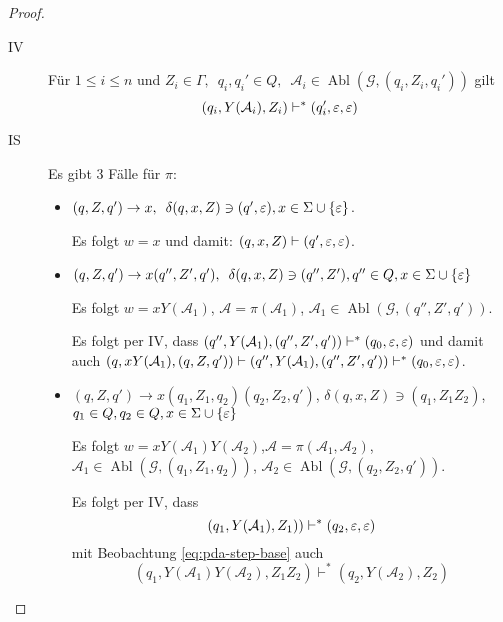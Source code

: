 \begin{proof}
\begin{itemize}
\begin{itemize}
      \begin{description}
      \item[IV] Für $1 \le i \le n$ und $Z_i \in \Gamma,\enspace q_i,q_i' \in Q,\enspace \mathcal{A}_i \in \operatorname{Abl}(\mathcal{G}, (q_i, Z_i, q_i'))$ gilt
        \begin{displaymath}
          (q_i,Y(\mathcal{A}_i),Z_i) \vdash^* (q_i',\varepsilon,\varepsilon)
        \end{displaymath}
      \item[IS]
        Es gibt $3$ Fälle für $\pi$:
        \begin{itemize}
        \item $(q, Z, q') \to x,\enspace \delta(q, x, Z) \ni (q', \varepsilon), x \in \Sigma \cup \{\varepsilon\}$.

          Es folgt $w = x$ und damit: $(q, x, Z) \vdash (q', \varepsilon, \varepsilon)$.

        \item $(q, Z, q') \to x(q'', Z', q'), \enspace \delta(q, x, Z) \ni (q'', Z'), q'' \in Q, x \in \Sigma \cup \{\varepsilon\}$

          Es folgt $w = xY(\mathcal{A}_1)$, $\mathcal{A} = \pi(\mathcal{A}_1)$, $\mathcal{A}_1 \in \operatorname{Abl}(\mathcal{G}, (q'', Z', q'))$.

          Es folgt per IV, dass $(q'', Y(\mathcal{A}_1), (q'', Z', q')) \vdash^* (q_0, \varepsilon, \varepsilon)$ und damit auch $(q, xY(\mathcal{A}_1), (q, Z, q')) \vdash (q'', Y(\mathcal{A}_1), (q'', Z', q')) \vdash^* (q_0, \varepsilon, \varepsilon)$.

        \item $(q, Z, q') \to x(q_1,Z_1,q_2)(q_2, Z_2, q')$, $\delta(q, x, Z) \ni (q_1, Z_1Z_2)$, $q_1 \in Q, q_2 \in Q, x \in \Sigma \cup \{\varepsilon\}$ 

          Es folgt $w = xY(\mathcal{A}_1)Y(\mathcal{A}_2)$,\enspace $\mathcal{A} = \pi(\mathcal{A}_1,\mathcal{A}_2)$,\enspace $\mathcal{A}_1 \in \operatorname{Abl}(\mathcal{G}, (q_1, Z_1, q_2))$, $\mathcal{A}_2 \in \operatorname{Abl}(\mathcal{G}, (q_2, Z_2, q'))$.

          Es folgt per IV, dass
          \begin{displaymath}
            (q_1, Y(\mathcal{A}_1), Z_1)) \vdash^* (q_2, \varepsilon, \varepsilon)
          \end{displaymath}
          mit Beobachtung \eqref{eq:pda-step-base} auch
          \begin{displaymath}
            (q_1, Y(\mathcal{A}_1)Y(\mathcal{A}_2), Z_1Z_2) \vdash^* (q_2, Y(\mathcal{A}_2), Z_2)
          \end{displaymath}


\end{itemize}
\end{description}
\end{itemize}
\end{itemize}
\end{proof}
